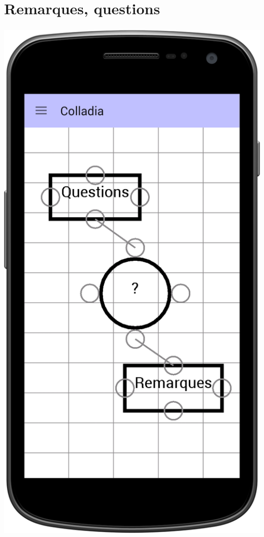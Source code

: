 \documentclass[11pt]{beamer}
\begin{document}
\section{Remarques, questions}
\begin{frame}
  \frametitle{\currentname}
  \begin{center}
  \includegraphics[scale=0.12]{img/thats-a-question}
  \end{center}
\end{frame}
\end{document}
